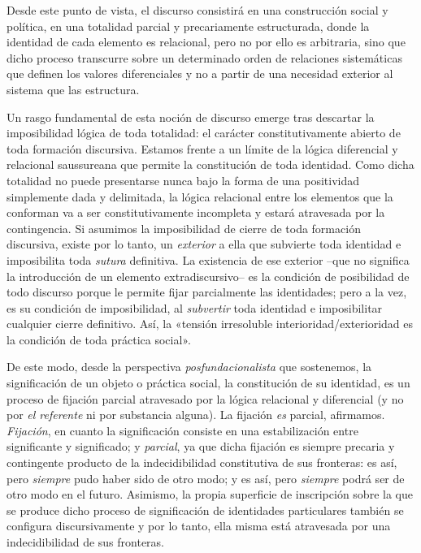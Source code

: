 Desde este punto de vista, el discurso consistirá en una construcción social y política, en una totalidad parcial y precariamente estructurada, donde la identidad de cada elemento es relacional, pero no por ello es arbitraria, sino que dicho proceso transcurre sobre un determinado orden de relaciones sistemáticas que definen los valores diferenciales y no a partir de una necesidad exterior al sistema que las estructura.

Un rasgo fundamental de esta noción de discurso emerge tras descartar la imposibilidad lógica de toda totalidad: el carácter constitutivamente abierto de toda formación discursiva. Estamos frente a un límite de la lógica diferencial y relacional saussureana que permite la constitución de toda identidad. Como dicha totalidad no puede presentarse nunca bajo la forma de una positividad simplemente dada y delimitada, la lógica relacional entre los elementos que la conforman va a ser constitutivamente incompleta y estará atravesada por la contingencia. Si asumimos la imposibilidad de cierre de toda formación discursiva, existe por lo tanto, un \emph{exterior} a ella que subvierte toda identidad e imposibilita toda \emph{sutura} definitiva. La existencia de ese exterior --que no significa la introducción de un elemento extradiscursivo-- es la condición de posibilidad de todo discurso porque le permite fijar parcialmente las identidades; pero a la vez, es su condición de imposibilidad, al \emph{subvertir} toda identidad e imposibilitar cualquier cierre definitivo. Así, la «tensión irresoluble interioridad/exterioridad es la condición de toda práctica social».

De este modo, desde la perspectiva \emph{posfundacionalista} que sostenemos, la significación de un objeto o práctica social, la constitución de su identidad, es un proceso de fijación parcial atravesado por la lógica relacional y diferencial (y no por \emph{el referente} ni por substancia alguna). La fijación \emph{es} parcial, afirmamos. \emph{Fijación}, en cuanto la significación consiste en una estabilización entre significante y significado; y \emph{parcial}, ya que dicha fijación es siempre precaria y contingente producto de la indecidibilidad constitutiva de sus fronteras: es así, pero \emph{siempre} pudo haber sido de otro modo; y es así, pero \emph{siempre} podrá ser de otro modo en el futuro. Asimismo, la propia superficie de inscripción sobre la que se produce dicho proceso de significación de identidades particulares también se configura discursivamente y por lo tanto, ella misma está atravesada por una indecidibilidad de sus fronteras.

